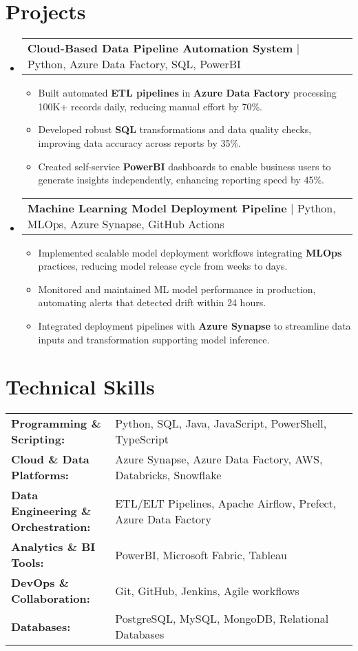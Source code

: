 \documentclass[letterpaper,11pt]{article}
\makeatletter
\newcommand{\resumeItem}[1]{
  \item\footnotesize{
    {#1 \vspace{-2pt}}
  }
}
\newcommand{\resumeProjectHeading}[2]{
    \item
    \begin{tabular*}{1.001\textwidth}{l@{\extracolsep{\fill}}r}
      \small#1 & \textbf{\small #2}\\
    \end{tabular*}\vspace{-7pt}
}
\newcommand{\resumeSubHeadingListStart}{\begin{itemize}[leftmargin=0pt, label={}]}
\newcommand{\resumeSubHeadingListEnd}{\end{itemize}}
\newcommand{\resumeItemListStart}{\begin{itemize}[leftmargin=*]}
\newcommand{\resumeItemListEnd}{\end{itemize}\vspace{-5pt}}
\makeatother
\begin{document}
\section{Projects}
    \vspace{-5pt}
    \resumeSubHeadingListStart
      \resumeProjectHeading
          {\textbf{Cloud-Based Data Pipeline Automation System} | Python, Azure Data Factory, SQL, PowerBI}{}
          \resumeItemListStart
              \resumeItem{Built automated \textbf{ETL pipelines} in \textbf{Azure Data Factory} processing 100K+ records daily, reducing manual effort by 70\%.}
              \resumeItem{Developed robust \textbf{SQL} transformations and data quality checks, improving data accuracy across reports by 35\%.}
              \resumeItem{Created self-service \textbf{PowerBI} dashboards to enable business users to generate insights independently, enhancing reporting speed by 45\%.}
          \resumeItemListEnd
          \vspace{-16pt}
      \resumeProjectHeading
          {\textbf{Machine Learning Model Deployment Pipeline} | Python, MLOps, Azure Synapse, GitHub Actions}{}
          \resumeItemListStart
              \resumeItem{Implemented scalable model deployment workflows integrating \textbf{MLOps} practices, reducing model release cycle from weeks to days.}
              \resumeItem{Monitored and maintained ML model performance in production, automating alerts that detected drift within 24 hours.}
              \resumeItem{Integrated deployment pipelines with \textbf{Azure Synapse} to streamline data inputs and transformation supporting model inference.}
          \resumeItemListEnd
    \resumeSubHeadingListEnd
\vspace{-10pt}
\section{Technical Skills}
        \vspace{-14pt}
        \begin{table}[h]
            \footnotesize
            \begin{tabular}{p{0.3\linewidth} p{0.7\linewidth}}
                \textbf{Programming \& Scripting:} & Python, SQL, Java, JavaScript, PowerShell, TypeScript \\
                \textbf{Cloud \& Data Platforms:} & Azure Synapse, Azure Data Factory, AWS, Databricks, Snowflake \\
                \textbf{Data Engineering \& Orchestration:} & ETL/ELT Pipelines, Apache Airflow, Prefect, Azure Data Factory \\
                \textbf{Analytics \& BI Tools:} & PowerBI, Microsoft Fabric, Tableau \\
                \textbf{DevOps \& Collaboration:} & Git, GitHub, Jenkins, Agile workflows \\
                \textbf{Databases:} & PostgreSQL, MySQL, MongoDB, Relational Databases \\
            \end{tabular}
        \end{table}
\end{document}
